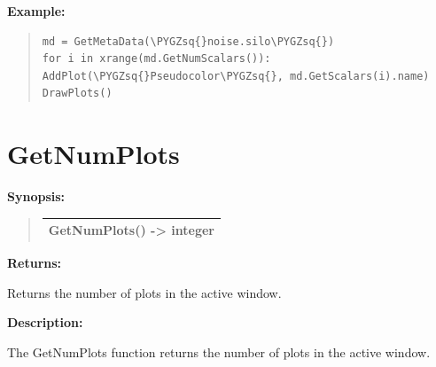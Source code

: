\documentclass[letterpaper,10pt,english]{sphinxmanual}
\def\PYGZsq{\char`\'}
\renewcommand\PYGZsq{\textquotesingle}
\begin{document}
\begin{DUlineblock}{0em}
\item[] 
\end{DUlineblock}

\begin{DUlineblock}{0em}
\item[] \textbf{Example:}
\item[] 
\end{DUlineblock}
\begin{quote}

\begin{Verbatim}[commandchars=\\\{\}]
md = GetMetaData(\PYGZsq{}noise.silo\PYGZsq{})
for i in xrange(md.GetNumScalars()):
AddPlot(\PYGZsq{}Pseudocolor\PYGZsq{}, md.GetScalars(i).name)
DrawPlots()
\end{Verbatim}
\end{quote}


\section{GetNumPlots}
\label{functions:getnumplots}
\begin{DUlineblock}{0em}
\item[] \textbf{Synopsis:}
\end{DUlineblock}
\begin{quote}

\begin{tabulary}{\linewidth}{|L|}
\hline

GetNumPlots() -\textgreater{} integer
\\
\hline\end{tabulary}

\end{quote}

\begin{DUlineblock}{0em}
\item[] 
\item[] \textbf{Returns:}
\item[] Returns the number of plots in the active window.
\item[] 
\item[] \textbf{Description:}
\item[] The GetNumPlots function returns the number of plots in the active window.
\end{DUlineblock}

\begin{DUlineblock}{0em}
\item[] 
\end{DUlineblock}
\end{document}

